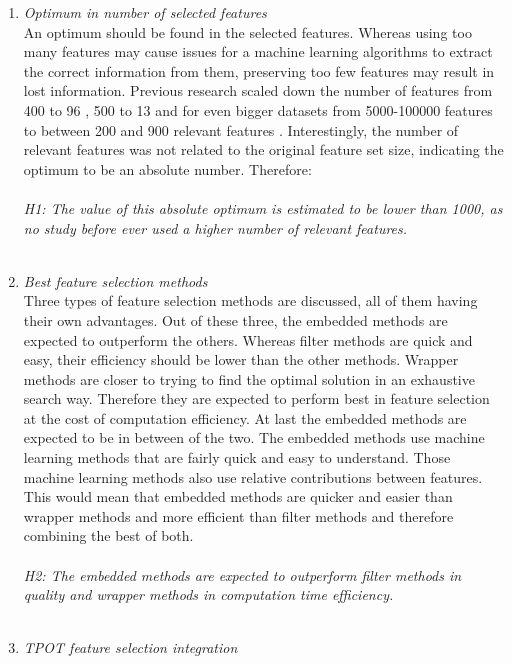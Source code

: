 \documentclass[10pt,a4paper]{report}
\begin{document}
	\begin{enumerate}
		\item \textit{Optimum in number of selected features} \\
		An optimum should be found in the selected features. Whereas using too many features may cause issues for a machine learning algorithms to extract the correct information from them, preserving too few features may result in lost information. Previous research scaled down the number of features from 400 to 96 \cite{pazzani1997learning}, 500 to 13 and for even bigger datasets from 5000-100000 features to between 200 and 900 relevant features \cite{chen2006combining}. Interestingly, the number of relevant features was not related to the original feature set size, indicating the optimum to be an absolute number. Therefore: \\
		\\
		\emph{H1: The value of this absolute optimum is estimated to be lower than 1000, as no study before ever used a higher number of relevant features.}\\
		\\
		\item \textit{Best feature selection methods} \\
		Three types of feature selection methods are discussed, all of them having their own advantages. Out of these three, the embedded methods are expected to outperform the others. Whereas filter methods are quick and easy, their efficiency should be lower than the other methods. Wrapper methods are closer to trying to find the optimal solution in an exhaustive search way. Therefore they are expected to perform best in feature selection at the cost of computation efficiency. At last the embedded methods are expected to be in between of the two. The embedded methods use machine learning methods that are fairly quick and easy to understand. Those machine learning methods also use relative contributions between features. This would mean that embedded methods are quicker and easier than wrapper methods and more efficient than filter methods and therefore combining the best of both. \\
		\\
		\emph{H2: The embedded methods are expected to outperform filter methods in quality and wrapper methods in computation time efficiency.}\\
		\\
		\item \textit{TPOT feature selection integration} \\

\end{enumerate}
\end{document}
